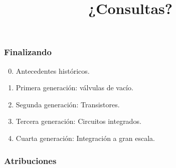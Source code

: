 \documentclass[11pt,a4paper,spanish]{beamer}
\begin{document}
\begin{frame}

    \frametitle{Finalizando}

\begin{enumerate}

    \setcounter{enumi}{-1}

    \item Antecedentes históricos.

    \item Primera generación: válvulas de vacío.

    \item Segunda generación: Transistores.

    \item Tercera generación: Circuitos integrados.

    \item Cuarta generación: Integración a gran escala.

\end{enumerate}

\end{frame}

\begin{frame}

\title{¿Consultas?}
\maketitle
\end{frame}

\setcounter{lastPage}{\number\value{page}}

\begin{frame}%

\frametitle{Atribuciones}


\tiny

\end{frame}

\setcounter{page}{\number\value{lastPage}}
\end{document}
